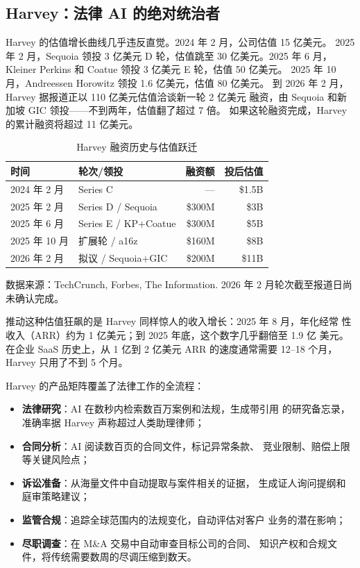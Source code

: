 \subsection{Harvey：法律 AI 的绝对统治者}
\label{subsec:ch08-harvey}

Harvey 的估值增长曲线几乎违反直觉。2024 年 2 月，公司估值 15 亿美元。
2025 年 2 月，Sequoia 领投 3 亿美元 D 轮，估值跳至 30 亿美元。2025 年
6 月，Kleiner Perkins 和 Coatue 领投 3 亿美元 E 轮，估值 50 亿美元。
2025 年 10 月，Andreessen Horowitz 领投 1.6 亿美元，估值 80 亿美元。
到 2026 年 2 月，Harvey 据报道正以 110 亿美元估值洽谈新一轮 2 亿美元
融资，由 Sequoia 和新加坡 GIC 领投——不到两年，估值翻了超过 7 倍。
如果这轮融资完成，Harvey 的累计融资将超过 11 亿美元。

\begin{table}[htbp]
\centering
\caption{Harvey 融资历史与估值跃迁}
\label{tab:harvey-funding}
\small
\begin{tabularx}{\textwidth}{l l r r}
\toprule
\rowcolor{figLightGray}
\textbf{时间} & \textbf{轮次/领投} & \textbf{融资额} & \textbf{投后估值} \\
\midrule
2024 年 2 月   & Series C             & ---           & \$1.5B \\
2025 年 2 月   & Series D / Sequoia   & \$300M        & \$3B   \\
2025 年 6 月   & Series E / KP+Coatue & \$300M        & \$5B   \\
2025 年 10 月  & 扩展轮 / a16z        & \$160M        & \$8B   \\
2026 年 2 月   & 拟议 / Sequoia+GIC   & \$200M        & \$11B  \\
\bottomrule
\end{tabularx}

\medskip
\noindent \small 数据来源：TechCrunch, Forbes, The Information.
2026 年 2 月轮次截至报道日尚未确认完成。
\end{table}

推动这种估值狂飙的是 Harvey 同样惊人的收入增长：2025 年 8 月，年化经常
性收入（ARR）约为 1 亿美元；到 2025 年底，这个数字几乎翻倍至 1.9 亿
美元。在企业 SaaS 历史上，从 1 亿到 2 亿美元 ARR 的速度通常需要 12--18
个月，Harvey 只用了不到 5 个月。

Harvey 的产品矩阵覆盖了法律工作的全流程：

\begin{itemize}
  \item \textbf{法律研究}：AI 在数秒内检索数百万案例和法规，生成带引用
    的研究备忘录，准确率据 Harvey 声称超过人类助理律师；
  \item \textbf{合同分析}：AI 阅读数百页的合同文件，标记异常条款、
    竞业限制、赔偿上限等关键风险点；
  \item \textbf{诉讼准备}：从海量文件中自动提取与案件相关的证据，
    生成证人询问提纲和庭审策略建议；
  \item \textbf{监管合规}：追踪全球范围内的法规变化，自动评估对客户
    业务的潜在影响；
  \item \textbf{尽职调查}：在 M\&A 交易中自动审查目标公司的合同、
    知识产权和合规文件，将传统需要数周的尽调压缩到数天。
\end{itemize}

